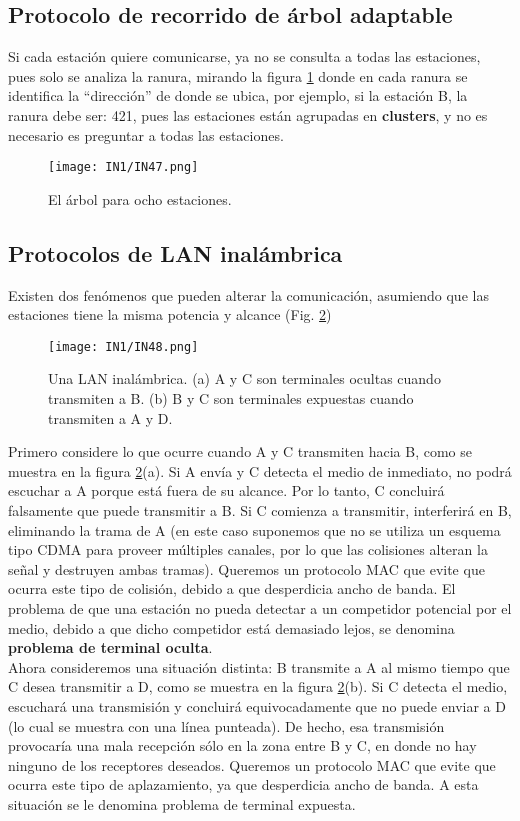 \documentclass[
	12pt, %
	fleqn, %
	a4paper, %
]{LegrandOrangeBook}
\begin{document}
\subsection{Protocolo de recorrido de árbol adaptable}
Si cada estación quiere comunicarse, ya no se consulta a todas las estaciones, pues solo se analiza la ranura, mirando la figura \ref{fig: arbol adaptativo} donde en cada ranura se identifica la ``dirección'' de donde se ubica, por ejemplo, si la estación B, la ranura debe ser: 421, pues las estaciones están agrupadas en \textbf{clusters}, y no es necesario es preguntar a todas las estaciones.
\begin{figure}[H]
\centering
\texttt{[image: IN1/IN47.png]}
\caption{El árbol para ocho estaciones.}
\label{fig: arbol adaptativo}
\end{figure}
\subsection{Protocolos de LAN inalámbrica}
Existen dos fenómenos que pueden alterar la comunicación, asumiendo que las estaciones tiene la misma potencia y alcance (Fig. \ref{fig:wireless lan})
\begin{figure}[]
\centering
\texttt{[image: IN1/IN48.png]}
\caption{Una LAN inalámbrica. (a) A y C son terminales ocultas cuando transmiten a B. (b) B y C son terminales expuestas cuando transmiten a A y D.}
\label{fig:wireless lan}
\end{figure}
Primero considere lo que ocurre cuando A y C transmiten hacia B, como se muestra en la figura \ref{fig:wireless lan}(a). Si A envía y C detecta el medio de inmediato, no podrá escuchar a A porque está fuera de su alcance. Por lo tanto, C concluirá falsamente que puede transmitir a B. Si C comienza a transmitir, interferirá en B, eliminando la trama de A (en este caso suponemos que no se utiliza un esquema tipo CDMA para proveer múltiples canales, por lo que las colisiones alteran la señal y destruyen ambas tramas). Queremos un protocolo MAC que evite que ocurra este tipo de colisión, debido a que desperdicia ancho de banda. El problema de que una estación no pueda detectar a un competidor potencial por el medio, debido a que dicho competidor está demasiado lejos, se denomina \textbf{problema de terminal oculta}.\\
Ahora consideremos una situación distinta: B transmite a A al mismo tiempo que C desea transmitir a D, como se muestra en la figura \ref{fig:wireless lan}(b). Si C detecta el medio, escuchará una transmisión y concluirá equivocadamente que no puede enviar a D (lo cual se muestra con una línea punteada). De hecho, esa transmisión provocaría una mala recepción sólo en la zona entre B y C, en donde no hay ninguno de los receptores deseados. Queremos un protocolo MAC que evite que ocurra este tipo de aplazamiento, ya que desperdicia ancho de banda. A esta situación se le denomina problema de terminal expuesta.\\
\end{document}
